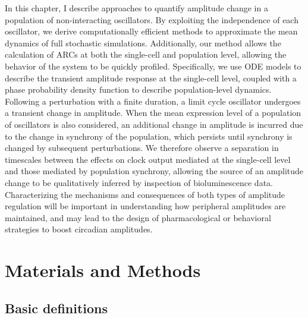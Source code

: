 In this chapter, I describe approaches to quantify amplitude change in a population of non-interacting oscillators.
By exploiting the independence of each oscillator, we derive computationally efficient methods to approximate the mean dynamics of full stochastic simulations.
Additionally, our method allows the calculation of ARCs at both the single-cell and population level, allowing the behavior of the system to be quickly profiled.
Specifically, we use ODE models to describe the transient amplitude response at the single-cell level, coupled with a phase probability density function to describe population-level dynamics.
Following a perturbation with a finite duration, a limit cycle oscillator undergoes a transient change in amplitude.
When the mean expression level of a population of oscillators is also considered, an additional change in amplitude is incurred due to the change in synchrony of the population, which persists until synchrony is changed by subsequent perturbations.
We therefore observe a separation in timescales between the effects on clock output mediated at the single-cell level and those mediated by population synchrony, allowing the source of an amplitude change to be qualitatively inferred by inspection of bioluminescence data.
Characterizing the mechanisms and consequences of both types of amplitude regulation will be important in understanding how peripheral amplitudes are maintained, and may lead to the design of pharmacological or behavioral strategies to boost circadian amplitudes.


\section{Materials and Methods}

\subsection{Basic definitions}

